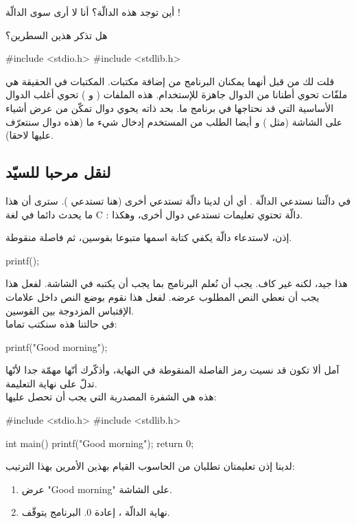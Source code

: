 \begin{question}
   أين توجد هذه الدالّة؟ أنا لا أرى سوى الدالّة  !
\end{question}

هل تذكر هذين السطرين؟
\begin{Csource}
#include <stdio.h>
#include <stdlib.h>
\end{Csource}
قلت لك من قبل أنهما يمكنان البرنامج من إضافة مكتبات. المكتبات في الحقيقة هي ملفّات تحوي أطنانا من الدوال جاهزة للإستخدام. هذه الملفات
( و )
 تحوي أغلب الدوال الأساسية التي قد نحتاجها في برنامج ما.
 بحد ذاته يحوي دوال تمكّن من عرض أشياء على الشاشة (مثل
) و أيضا الطلب من المستخدم إدخال شيء ما (هذه دوال سنتعرّف عليها لاحقا).

\subsection{لنقل مرحبا للسيّد}
في دالّتنا
نستدعي الدالّة
. أي أن لدينا دالّة تستدعي أخرى (هنا
تستدعي
). سترى أن هذا ما يحدث دائما في لغة
\textenglish{C}
: دالّة تحتوي تعليمات تستدعي دوال أخرى، وهكذا.

إذن، لاستدعاء دالّة يكفي كتابة اسمها متبوعا بقوسين، ثم فاصلة منقوطة.
\begin{Csource}
printf();
\end{Csource}

هذا جيد، لكنه غير كاف. يجب أن نُعلم البرنامج بما يجب أن يكتبه في الشاشة. لفعل هذا يجب أن نعطي
النص المطلوب عرضه. لفعل هذا نقوم بوضع النص داخل علامات الإقتباس المزدوجة بين القوسين.\\
في حالتنا هذه سنكتب تماما:
\begin{Csource}
printf("Good morning\n");
\end{Csource}

آمل ألا تكون قد نسيت رمز الفاصلة المنقوطة في النهاية، وأذكّرك أنّها مهمّة جدا لأنّها تدلّ على نهاية التعليمة.\\
هذه هي الشفرة المصدرية التي يجب أن تحصل عليها:
\begin{Csource}
#include <stdio.h>
#include <stdlib.h>

int main()
{
    printf("Good morning");
    return 0;
}
\end{Csource}

لدينا إذن تعليمتان تطلبان من الحاسوب القيام بهذين الأمرين بهذا الترتيب:
\begin{enumerate}
  \item عرض
"\textenglish{Good morning}"
على الشاشة.
  \item نهاية الدالّة
، إعادة 0. البرنامج يتوقّف.
\end{enumerate}

